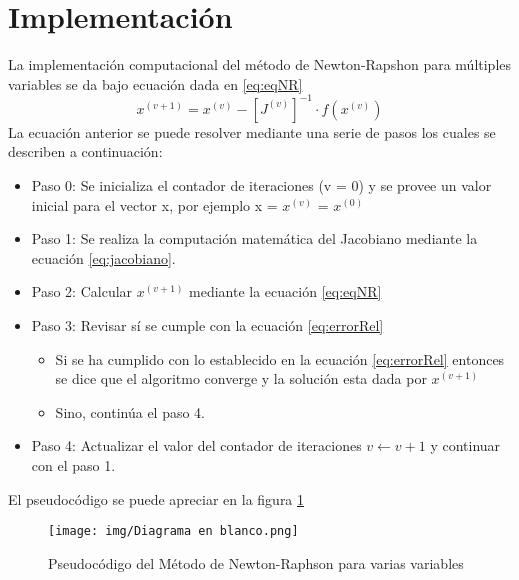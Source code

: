 \documentclass[journal]{IEEEtran}
\begin{document}

\section{Implementación}
La implementación computacional del método de Newton-Rapshon para múltiples variables se da bajo ecuación dada en \ref{eq:eqNR}
\begin{equation}
    x^{(v + 1)} = x^{(v)} - [J^{(v)}]^{-1} \cdot f(x^{(v)})
    \label{eq:eqNR}
\end{equation}
La ecuación anterior se puede resolver mediante una serie de pasos los cuales se describen a continuación:  
\begin{itemize}
    \item Paso 0: Se inicializa el contador de iteraciones (v = 0) y se provee un valor inicial para el vector x, por ejemplo x = $x^{(v)}$ = $x^{(0)}$
    \item Paso 1: Se realiza la computación matemática del Jacobiano mediante la ecuación \ref{eq:jacobiano}. 
    \item Paso 2: Calcular $x^{(v+1)}$ mediante la ecuación \ref{eq:eqNR}
    \item Paso 3: Revisar sí se cumple con la ecuación \ref{eq:errorRel}
    \begin{itemize}
        \item Si se ha cumplido con lo establecido en la ecuación \ref{eq:errorRel} entonces se dice que el algoritmo converge y la solución esta dada por $x^{(v+1)}$
        \item Sino, continúa el paso 4. 
    \end{itemize}
    \item Paso 4: Actualizar el valor del contador de iteraciones $v \leftarrow v+1$ y continuar con el paso 1. 
\end{itemize}

El pseudocódigo se puede apreciar en la figura \ref{fig:NRP}

\begin{figure}[H]
	\centering
	\texttt{[image: img/Diagrama en blanco.png]}
	\caption{Pseudocódigo del Método de Newton-Raphson para varias variables}
	\label{fig:NRP}
\end{figure}
\end{document}
